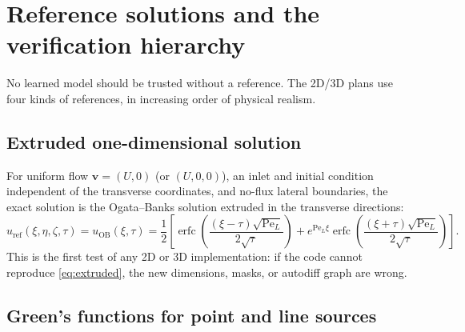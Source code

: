 \documentclass[11pt]{article}
\newcommand{\erfc}{\operatorname{erfc}}
\newcommand{\Pe}{\mathrm{Pe}}
\newcommand{\vv}{\mathbf{v}}
\begin{document}
\section{Reference solutions and the verification hierarchy}
\label{sec:references}

No learned model should be trusted without a reference.  The 2D/3D plans use
four kinds of references, in increasing order of physical realism.

\subsection{Extruded one-dimensional solution}

For uniform flow $\vv=(U,0)$ (or $(U,0,0)$), an inlet and initial condition
independent of the transverse coordinates, and no-flux lateral boundaries, the
exact solution is the Ogata--Banks solution extruded in the transverse
directions:
\begin{equation}
\label{eq:extruded}
u_{\mathrm{ref}}(\xi,\eta,\zeta,\tau)=u_{\mathrm{OB}}(\xi,\tau)
=\frac12\left[
\erfc\!\left(\frac{(\xi-\tau)\sqrt{\Pe_L}}{2\sqrt{\tau}}\right)
+e^{\Pe_L\xi}\erfc\!\left(\frac{(\xi+\tau)\sqrt{\Pe_L}}{2\sqrt{\tau}}\right)
\right].
\end{equation}
This is the first test of any 2D or 3D implementation: if the code cannot
reproduce \eqref{eq:extruded}, the new dimensions, masks, or autodiff graph are
wrong.

\subsection{Green's functions for point and line sources}
\end{document}
